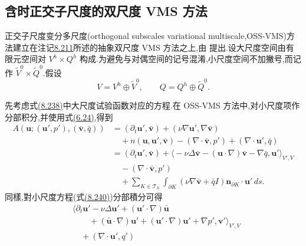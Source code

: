 \subsection{含时正交子尺度的双尺度 VMS 方法}
\label{subsec:vms-time-dependent-method}

\begin{note}[主要思路与方法推导]
\label{note:vms-oss-derivation}
正交子尺度变分多尺度(orthogonal subscales variational multiscale,OSS-VMS)方法建立在注记\hyperref[note:vms-two-scale-basic-approach]{8.211}所述的抽象双尺度 VMS 方法之上,由 \textcite{Codina2002} 提出.设大尺度空间由有限元空间对 $V^h\times Q^h$ 构成.为避免与对偶空间的记号混淆,小尺度空间不加撇号,而记作 $\widetilde V^0\times\widetilde Q^0$.假设
\[
 V=V^h\oplus\widetilde V^0,\qquad Q=Q^h\oplus\widetilde Q^0.
\]

先考虑式\hyperref[eq:vms-two-scale-decomposition-1]{(8.238)}中大尺度试验函数对应的方程.在 OSS-VMS 方法中,对小尺度项作分部积分,并使用式\hyperref[eq:steady-ns-conv-skew]{(6.24)},得到
\begin{equation}\label{eq:vms-oss-large-scale-integration-by-parts}
\begin{aligned}
 A(\bm u;(\bm u',p'),(\bar{\bm v},\bar q))
 &= (\partial_t\bm u',\bar{\bm v})
    +(\nu\nabla\bm u',\nabla\bar{\bm v})\\
 &\quad+n(\bm u,\bm u',\bar{\bm v})
    -(\nabla\cdot\bar{\bm v},p')
    +(\nabla\cdot\bm u',\bar q)\\
 &= (\partial_t\bm u',\bar{\bm v})
    +\bigl\langle-\nu\Delta\bar{\bm v}
      -(\bm u\cdot\nabla)\bar{\bm v}-\nabla\bar q,
      \bm u'\bigr\rangle_{V',V}\\
 &\quad-(\nabla\cdot\bar{\bm v},p')\\
 &\quad+\sum_{K\in\mathcal T_h}\int_{\partial K}
      (\nu\nabla\bar{\bm v}+\bar q I)
      \bm n_{\partial K}\cdot\bm u'\,ds.
\end{aligned}
\end{equation}
同樣,對小尺度方程(式\hyperref[eq:vms-two-scale-unresolved-equation]{(8.240)})分部積分可得
\begin{equation}\label{eq:vms-oss-small-scale-integration-by-parts}
\begin{aligned}
 &\bigl\langle\partial_t\bm u'-\nu\Delta\bm u'
   +(\bm u'\cdot\nabla)\bar{\bm u}\\
 &\qquad+(\bar{\bm u}\cdot\nabla)\bm u'
   +(\bm u'\cdot\nabla)\bm u'+\nabla p',
   \bm v'\bigr\rangle_{V',V}\\
 &\quad+(\nabla\cdot\bm u',q')\\

\end{aligned}
\end{equation}
\end{note}
